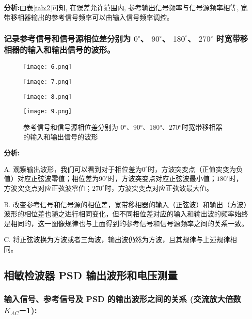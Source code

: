 \documentclass{whureport}
\begin{document}
\begin{multicols}{2}
\textbf{分析:}由表\ref{tab:2}可知, 在误差允许范围内, 参考输出信号频率与信号源频率相等, 宽带移相器输出的参考信号频率可以由输入信号频率调控。

\subsubsection{记录参考信号和信号源相位差分别为 $0^\circ$、 $90^\circ$、 $180^\circ$、 $270^\circ$ 时宽带移相器的输入和输出信号的波形。}

\begin{figure}[H]
    \centering
    \texttt{[image: 6.png]}
    \label{example}
\end{figure}
\begin{figure}[H]
    \centering
    \texttt{[image: 7.png]}
    \label{example}
\end{figure}
\begin{figure}[H]
    \centering
    \texttt{[image: 8.png]}
    \label{example}
\end{figure}
\begin{figure}[H]
    \centering
    \texttt{[image: 9.png]}
    \caption{参考信号和信号源相位差分别为 0°、90°、180°、270°时宽带移相器的输入和输出信号的波形}	
    \label{example}
\end{figure}

\textbf{分析:}

A. 观察输出波形，我们可以看到对于相位差为$0^\circ$时，方波突变点（正值突变为负值）对应正弦波零值；相位差为$90^\circ$时，方波突变点对应正弦波最小值；$180^\circ$时，方波突变点对应正弦波零值；$270^\circ$时，方波突变点对应正弦波最大值。

B. 改变参考信号和信号源的相位差，宽带移相器的输入（正弦波）和输出（方波）波形的相位差也随之进行相同变化，但不同相位差对应的输入和输出波的频率始终是相同的，这一图像规律也与上面得到的参考信号和信号源频率之间的关系一致。

C. 将正弦波换为方波或者三角波，输出波仍然为方波，且其规律与上述规律相同。

\subsection{相敏检波器 PSD 输出波形和电压测量}

\subsubsection{输入信号、参考信号及 PSD 的输出波形之间的关系 (交流放大倍数$K_{AC}$=1):}


\end{multicols}
\end{document}
